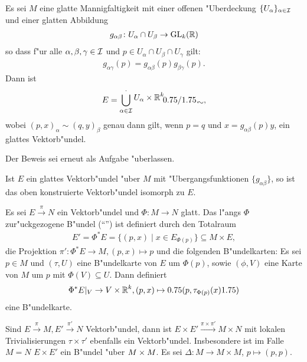 \begin{Satz}\label{satz-5-2}
  Es sei $M$ eine glatte Mannigfaltigkeit mit einer offenen "Uberdeckung $\{U_{\alpha}\}_{\alpha \in \operatorname{\mathcal{I}}}$ und einer glatten Abbildung
  \begin{align*}
    g_{\alpha\beta} \colon U_{\alpha} \cap U_{\beta} \to \operatorname{GL}_k(\operatorname{\mathbb{R}})
  \end{align*}
so dass f"ur alle $\alpha,\beta,\gamma \in \operatorname{\mathcal{I}}$ und $p \in U_{\alpha} \cap U_{\beta} \cap U_{\gamma}$ gilt:
\begin{align*}
  g_{\alpha\gamma} (p) = g_{\alpha\beta}(p)g_{\beta\gamma}(p).
\end{align*}
Dann ist
	\[ E = \bigcup_{\alpha \in \calI}^{\cdot} \FakRaum{U_{\alpha} \times \R^k}{\sim}, \]
wobei $(p,x)_{\alpha} \sim (q,y)_{\beta}$ genau dann gilt, wenn $p = q$ und $x = g_{\alpha\beta}(p)y$, ein glattes Vektorb"undel.
\end{Satz}

Der Beweis sei erneut als Aufgabe "uberlassen.

\begin{kor}
  Ist $E$ ein glattes Vektorb"undel "uber $M$ mit "Ubergangsfunktionen $\{g_{\alpha\beta}\}$, so ist das oben konstruierte Vektorb"undel isomorph zu $E$.
\end{kor}

Es sei $E \xrightarrow{\pi} N$ ein Vektorb"undel und $\Phi \colon M \to N$ glatt.
Das l"angs $\Phi$ zur"uckgezogene B"undel ("`"') ist definiert durch den Totalraum
\begin{align*}
  E' = \Phi^{\ast}E = \{(p,x) \mid x \in E_{\Phi(p)}\} \subseteq M \times E,
\end{align*}
die Projektion $\pi' \colon \Phi^{\ast}E \to M, (p,x) \mapsto p$ und die folgenden B"undelkarten:
Es sei $p \in M$ und $(\tau, U)$ eine B"undelkarte von $E$ um $\Phi(p)$, sowie $(\phi,V)$ eine Karte von $M$ um $p$ mit $\Phi(V) \subseteq U$.
Dann definiert 
\begin{align*}
  \Phi^{\ast}E|_V \to V \times \operatorname{\mathbb{R}}^k, (p,x) \mapsto 0.75(p, \tau_{\Phi(p)}(x)1.75)
\end{align*}
eine B"undelkarte.

Sind $E \xrightarrow{\pi} M, E' \xrightarrow{\pi'} N$ Vektorb"undel, dann ist $E \times E' \xrightarrow{\pi \times \pi'} M \times N$ mit lokalen Trivialisierungen $\tau \times \tau'$ ebenfalls ein Vektorb"undel.
Insbesondere ist im Falle $M = N$ $E \times E'$ ein B"undel "uber $M \times M$.
Es sei $\Delta \colon M \to M \times M$, $p \mapsto (p,p)$.

